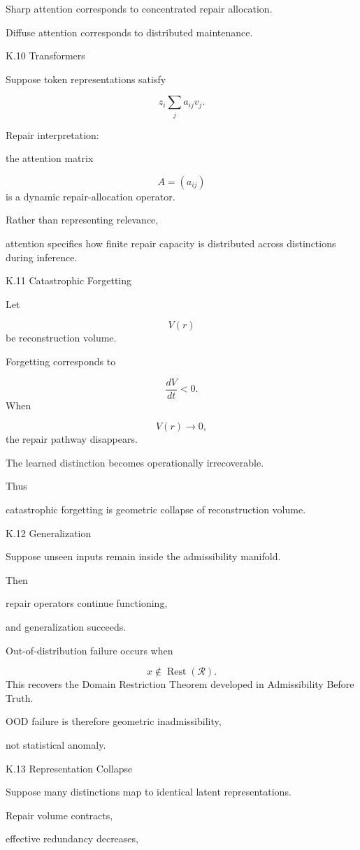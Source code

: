 \documentclass[12pt,oneside]{article}
\theoremstyle{plain}
\theoremstyle{definition}
\theoremstyle{remark}
\DeclareMathOperator{\Rest}{Rest}
\begin{document}
Sharp attention corresponds to concentrated repair allocation.

Diffuse attention corresponds to distributed maintenance.


K.10 Transformers

Suppose token representations satisfy

\[
z_i
\sum_j
a_{ij}
v_j.
\]

Repair interpretation:

the attention matrix

\[
A=(a_{ij})
\]
is a dynamic repair-allocation operator.

Rather than representing relevance,

attention specifies how finite repair capacity is distributed across distinctions during inference.


K.11 Catastrophic Forgetting

Let

\[
V(r)
\]
be reconstruction volume.

Forgetting corresponds to

\[
\frac{dV}{dt}
<
0.
\]
When

\[
V(r)
\rightarrow0,
\]
the repair pathway disappears.

The learned distinction becomes operationally irrecoverable.

Thus

catastrophic forgetting is geometric collapse of reconstruction volume.


K.12 Generalization

Suppose unseen inputs remain inside the admissibility manifold.

Then

repair operators continue functioning,

and generalization succeeds.

Out-of-distribution failure occurs when

\[
x
\notin
\Rest(\mathcal R).
\]
This recovers the Domain Restriction Theorem developed in Admissibility Before Truth.

OOD failure is therefore geometric inadmissibility,

not statistical anomaly.


K.13 Representation Collapse

Suppose many distinctions map to identical latent representations.

Repair volume contracts,

effective redundancy decreases,
\end{document}
